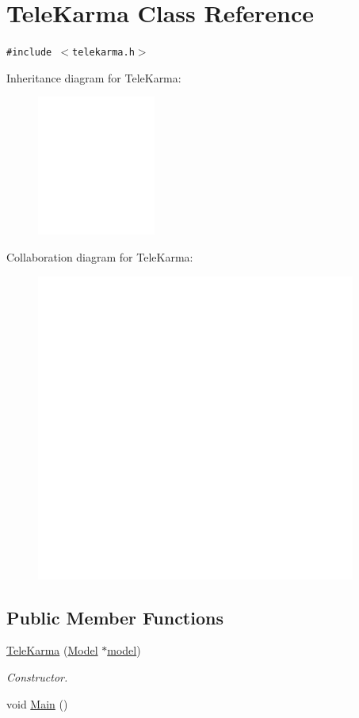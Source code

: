 \hypertarget{classTeleKarma}{
\section{TeleKarma Class Reference}
\label{classTeleKarma}
}
{\tt \#include $<$telekarma.h$>$}

Inheritance diagram for TeleKarma:\nopagebreak
\begin{figure}[H]
\begin{center}
\leavevmode
\includegraphics[width=110pt]{classTeleKarma__inherit__graph}
\end{center}
\end{figure}
Collaboration diagram for TeleKarma:\nopagebreak
\begin{figure}[H]
\begin{center}
\leavevmode
\includegraphics[width=298pt]{classTeleKarma__coll__graph}
\end{center}
\end{figure}
\subsection*{Public Member Functions}
\begin{CompactItemize}
\item 
\hyperlink{classTeleKarma_ffedc7e09446314b687922735cd7818f}{TeleKarma} (\hyperlink{classModel}{Model} $\ast$\hyperlink{classController_6f6ea54052742d3940adfcfce885bae9}{model})
\begin{CompactList}\small\item\em Constructor. \item\end{CompactList}\item 
void \hyperlink{classTeleKarma_addd554bf6335422cc896c894005a031}{Main} ()
\end{CompactItemize}


